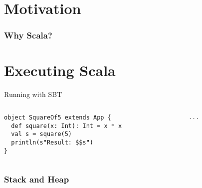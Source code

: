 \documentclass[aspectratio=169]{beamer}
\begin{document}
\frame[plain]{\titlepage}


\section{Motivation}

\begin{frame}\frametitle{Why Scala?}
    

\end{frame}

\section{Executing Scala}

\begin{frame}[fragile]{Running with SBT}
~\\[-8mm]
\begin{columns}
\begin{column}{0.48\textwidth}
\begin{lstlisting}
object SquareOf5 extends App {
  def square(x: Int): Int = x * x
  val s = square(5)
  println(s"Result: $$s")
}
\end{lstlisting}
\end{column}
\begin{column}{0.48\textwidth}
\begin{lstlisting}[language=scala]
...
\end{lstlisting}
\end{column}
\end{columns}
\end{frame}


\begin{frame}\frametitle{Stack and Heap}
    \centering
    

\end{frame}
\end{document}
